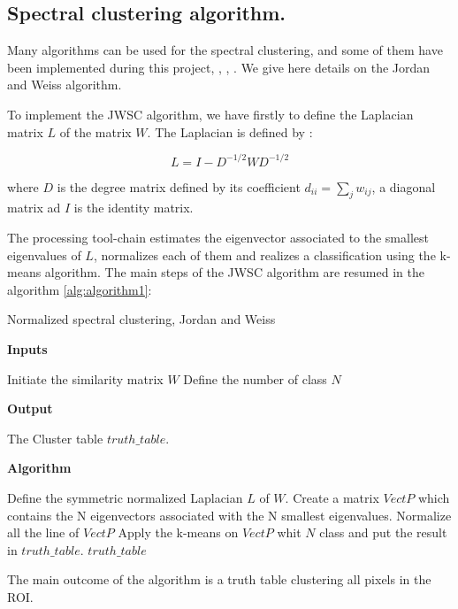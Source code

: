 \subsection{Spectral clustering algorithm.}

Many algorithms can be used for the spectral clustering, and some of them have been implemented during this project, \cite{von2007tutorial}, \cite{ng2002spectral},  \cite{shi2000normalized}. We give here details on the Jordan and Weiss algorithm.

To implement the JWSC algorithm, we have firstly to define the Laplacian matrix $L$ of the matrix $W$. The Laplacian is defined by :

\begin{equation}
L = I-D^{-1/2}WD^{-1/2}
\end{equation}

where $D$ is the degree matrix defined by its coefficient $d_{ii} = \sum_j w_{ij}$, a diagonal matrix ad $I$ is the identity matrix.

The processing tool-chain estimates the eigenvector associated to the smallest eigenvalues of $L$, normalizes each of them and realizes a classification using the k-means algorithm. The main steps of the JWSC algorithm are resumed in the algorithm \ref{alg:algorithm1}:

\begin{algorithm}
  \caption{Normalized spectral clustering, Jordan and Weiss }
  
  \textbf{Inputs}%
  \begin{algorithmic}[1]
    \STATE Initiate the similarity matrix $W$
    \STATE Define the number of class $N$
  \end{algorithmic}
  \bigskip

  \textbf{Output}%
  \begin{algorithmic}[1]
    \STATE The Cluster table $truth\_table$.
  \end{algorithmic}
  \bigskip
  
  \textbf{Algorithm}
  \begin{algorithmic}[1]
		\STATE Define the symmetric normalized Laplacian $L$ of $W$.
     	\STATE Create a matrix $VectP$ which contains the N eigenvectors associated with the N smallest eigenvalues.
     	\STATE Normalize all the line of $VectP$
     	\STATE Apply the k-means on $VectP$ whit $N$ class and put the result in $truth\_table$.	
  \RETURN $truth\_table$
  \end{algorithmic}
  \label{alg:algorithm1}
\end{algorithm}

The main outcome of the algorithm is a truth table clustering all pixels in the ROI.
